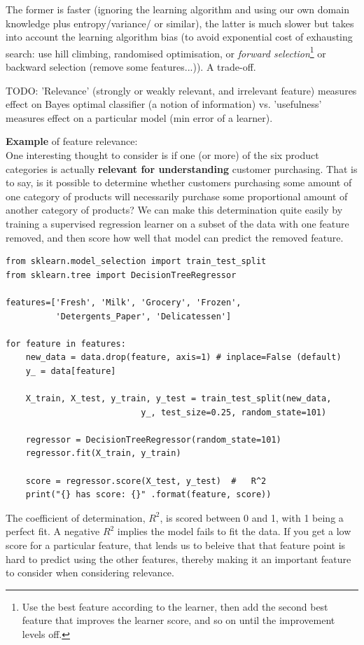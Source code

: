 \documentclass[11pt]{article}
\begin{document}
The former is faster (ignoring the learning algorithm and using our own domain knowledge plus entropy/variance/ or similar), the latter is much slower but takes into account the learning algorithm bias (to avoid exponential cost of exhausting search: use hill climbing, randomised optimisation, or \textit{forward selection}\footnote{Use the best feature according to the learner, then add the second best feature that improves the learner score, and so on until the improvement levels off.} or backward selection (remove some features...)). A trade-off.

TODO: 'Relevance' (strongly or weakly relevant, and irrelevant feature) measures effect on Bayes optimal classifier (a notion of information) vs. 'usefulness' measures effect on a particular model (min error of a learner).

\textbf{Example} of feature relevance: \\
{\small One interesting thought to consider is if one (or more) of the six product categories is actually \textbf{relevant for understanding} customer purchasing. That is to say, is it possible to determine whether customers purchasing some amount of one category of products will necessarily purchase some proportional amount of another category of products? We can make this determination quite easily by training a supervised regression learner on a subset of the data with one feature removed, and then score how well that model can predict the removed feature.}

\begin{lstlisting}
from sklearn.model_selection import train_test_split
from sklearn.tree import DecisionTreeRegressor

features=['Fresh', 'Milk', 'Grocery', 'Frozen', 
		  'Detergents_Paper', 'Delicatessen']

for feature in features:        
	new_data = data.drop(feature, axis=1) # inplace=False (default)
	y_ = data[feature]

	X_train, X_test, y_train, y_test = train_test_split(new_data, 
	                       y_, test_size=0.25, random_state=101)

	regressor = DecisionTreeRegressor(random_state=101)
	regressor.fit(X_train, y_train)

	score = regressor.score(X_test, y_test)  #   R^2
	print("{} has score: {}" .format(feature, score))
\end{lstlisting}
{\small The coefficient of determination, $R^2$, is scored between 0 and 1, with 1 being a perfect fit. A negative $R^2$ implies the model fails to fit the data. If you get a low score for a particular feature, that lends us to beleive that that feature point is hard to predict using the other features, thereby making it an important feature to consider when considering relevance.}
\end{document}
